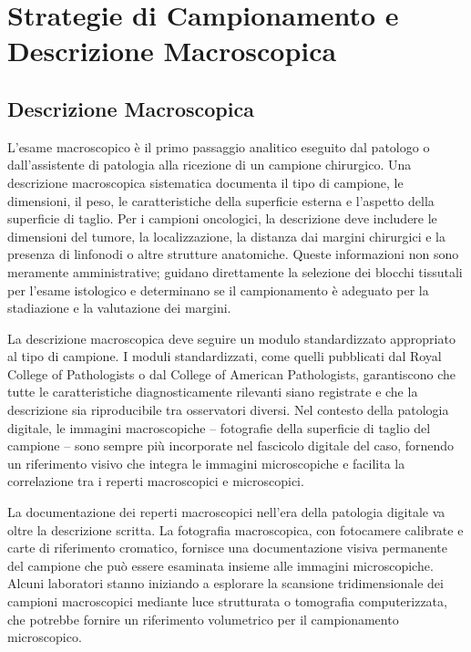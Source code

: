 \section{Strategie di Campionamento e Descrizione Macroscopica}
\label{sec:ch2-sampling}

\subsection{Descrizione Macroscopica}

L'esame macroscopico è il primo passaggio analitico eseguito dal patologo o dall'assistente di
patologia alla ricezione di un campione chirurgico. Una descrizione macroscopica sistematica
documenta il tipo di campione, le dimensioni, il peso, le caratteristiche della superficie esterna
e l'aspetto della superficie di taglio. Per i campioni oncologici, la descrizione deve includere
le dimensioni del tumore, la localizzazione, la distanza dai margini chirurgici e la presenza di
linfonodi o altre strutture anatomiche. Queste informazioni non sono meramente amministrative;
guidano direttamente la selezione dei blocchi tissutali per l'esame istologico e determinano se
il campionamento è adeguato per la stadiazione e la valutazione dei margini.

La descrizione macroscopica deve seguire un modulo standardizzato appropriato al tipo di campione.
I moduli standardizzati, come quelli pubblicati dal Royal College of Pathologists o dal College
of American Pathologists, garantiscono che tutte le caratteristiche diagnosticamente rilevanti
siano registrate e che la descrizione sia riproducibile tra osservatori diversi. Nel contesto
della patologia digitale, le immagini macroscopiche -- fotografie della superficie di taglio del
campione -- sono sempre più incorporate nel fascicolo digitale del caso, fornendo un riferimento
visivo che integra le immagini microscopiche e facilita la correlazione tra i reperti macroscopici
e microscopici.

La documentazione dei reperti macroscopici nell'era della patologia digitale va oltre la
descrizione scritta. La fotografia macroscopica, con fotocamere calibrate e carte di riferimento
cromatico, fornisce una documentazione visiva permanente del campione che può essere esaminata
insieme alle immagini microscopiche. Alcuni laboratori stanno iniziando a esplorare la scansione
tridimensionale dei campioni macroscopici mediante luce strutturata o tomografia computerizzata,
che potrebbe fornire un riferimento volumetrico per il campionamento microscopico.

